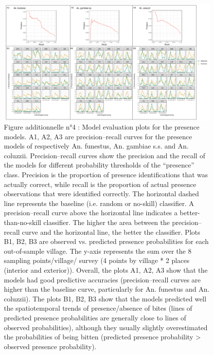 \documentclass[12pt,twoside]{reedthesis}
\begin{document}
\begin{figure}

{\centering \includegraphics[width=1\linewidth]{figure/add_file_4} 

}

\caption[Article n°1 - Figure additionnelle n°4]{Figure additionnelle n°4 : Model evaluation plots for the presence models. A1, A2, A3 are precision–recall curves for the presence models of respectively An. funestus, An. gambiae s.s. and An. coluzzii. Precision–recall curves show the precision and the recall of the models for different probability thresholds of the “presence” class. Precision is the proportion of presence identifications that was actually correct, while recall is the proportion of actual presence observations that were identified correctly. The horizontal dashed line represents the baseline (i.e. random or no-skill) classifier. A precision–recall curve above the horizontal line indicates a better-than-no-skill classifier. The higher the area between the precision–recall curve and the horizontal line, the better the classifier. Plots B1, B2, B3 are observed vs. predicted presence probabilities for each out-of-sample village. The y-axis represents the sum over the 8 sampling points/village/ survey (4 points by village * 2 places (interior and exterior)). Overall, the plots A1, A2, A3 show that the models had good predictive accuracies (precision–recall curves are higher than the baseline curve, particularly for An. funestus and An. coluzzii). The plots B1, B2, B3 show that the models predicted well the spatiotemporal trends of presence/absence of bites (lines of predicted presence probabilities are generally close to lines of observed probabilities), although they usually slightly overestimated the probabilities of being bitten (predicted presence probability > observed presence probability).}\label{fig:add-file-4}
\end{figure}
\end{document}
